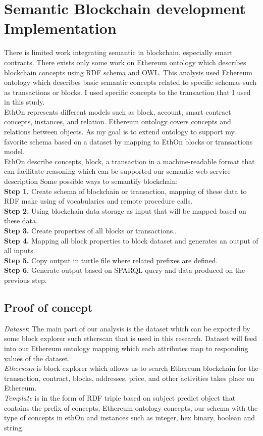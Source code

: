 \section{Semantic Blockchain development Implementation}
There is limited work integrating semantic in blockchain, especially smart contracts. There exists only some work on Ethereum ontology which describes blockchain concepts using RDF schema and OWL. This analysis used Ethereum ontology which describes basic semantic concepts related to specific schemas such as transactions or blocks. I used specific concepts to the transaction that I used in this study.\\
EthOn represents different models such as block, account, smart contract concepts, instances, and relation.
Ethereum ontology covers concepts and relations between objects. As my goal is to extend ontology to support my favorite schema based on a dataset by mapping to EthOn blocks or transactions model.\\
EthOn describe concepts, block, a transaction in a machine-readable format that can facilitate reasoning which can be supported our semantic web service description
Some possible ways to semantify blockchain:\\
\textbf{Step 1.} Create schema of blockchain or transaction, mapping of these data to RDF make using of vocabularies and remote procedure calls.\\
\textbf{Step 2.} Using blockchain data storage as input that will be mapped based on these data.\\
\textbf{Step 3.} Create properties of all blocks or transactions..\\
\textbf{Step 4.} Mapping all block properties to block dataset and generates an output of all inputs.\\
\textbf{Step 5.} Copy output in turtle file where related prefixes are defined.\\
\textbf{Step 6.} Generate output based on SPARQL query and data produced on the previous step.\\

\subsection{Proof of concept}
\textit{Dataset}: The main part of our analysis is the dataset which can be exported by some block explorer such etherscan that is used in this research. Dataset will feed into our Ethereum ontology mapping which each attributes map to responding values of the dataset.\\
\textit{Etherscan} is block explorer which allows us to search Ethereum blockchain for the transaction, contract, blocks, addresses, price, and other activities takes place on Ethereum.\\
\textit{Template} is in the form of RDF triple based on subject predict object that contains the prefix of concepts, Ethereum ontology concepts, our schema with the type of concepts in ethOn and instances such as integer, hex binary, boolean and string.\\

